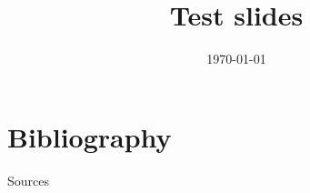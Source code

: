 

\title{Test slides}
\subtitle{}
\author{}
\institute{}
\date{\today}





\begin{frame}
    \titlepage
\end{frame}




\appendix
\begingroup

\section{Bibliography}
\begin{frame}[allowframebreaks]{Sources}
  \printbibliography[heading=none]
\end{frame}




